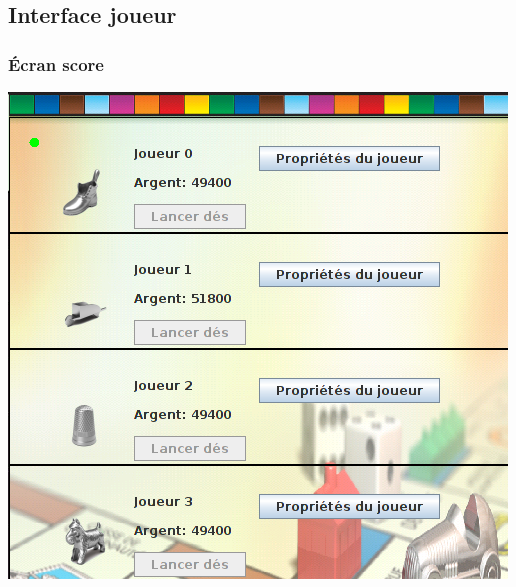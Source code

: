 \documentclass{beamer}
\begin{document}
\begin{darkframes}
\begin{frame}
\begin{center}
	\end{center}
    \end{frame}
    
    \subsection{Interface joueur}
     \begin{frame}
 	 \frametitle{Écran score}
 	 \begin{center}
 	 \includegraphics[scale=0.50]{./img/scoreJoueur.png}
		
	\end{center}
    \end{frame}
    

\end{darkframes}
\end{document}
